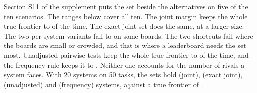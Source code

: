 \documentclass[11pt]{article}
\begin{document}
Section S11 of the supplement puts the set beside the alternatives on five of the ten scenarios. The ranges below cover all ten. The joint margin keeps the whole true frontier \NumValAltJointJointMin{} to \NumValAltJointJointMax{} of the time. The exact joint set does the same, at a larger size. The two per-system variants fall to \NumValAltPersystemJointMin{} on some boards. The two shortcuts fail where the boards are small or crowded, and that is where a leaderboard needs the set most. Unadjusted pairwise tests keep the whole true frontier \NumValAltUnadjustedJointMin{} to \NumValAltUnadjustedJointMax{} of the time, and the frequency rule keeps it \NumValAltFrequencyJointMin{} to \NumValAltFrequencyJointMax{}. Neither one accounts for the number of rivals a system faces. With 20 systems on 50 tasks, the sets hold \NumValAltJointSizeKTwentyFifty{} (joint), \NumValAltExactjointSizeKTwentyFifty{} (exact joint), \NumValAltUnadjustedSizeKTwentyFifty{} (unadjusted) and \NumValAltFrequencySizeKTwentyFifty{} (frequency) systems, against a true frontier of \NumValTrueSizeA{}.
\end{document}
